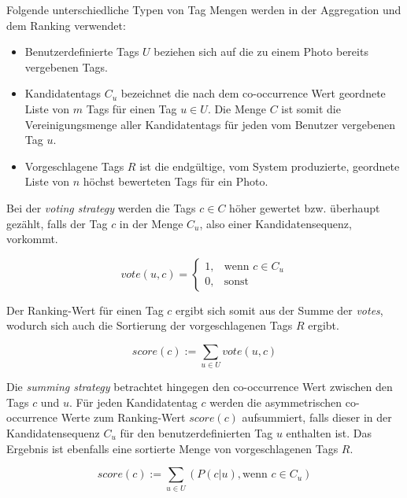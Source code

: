 Folgende unterschiedliche Typen von Tag Mengen werden in der Aggregation und dem Ranking verwendet:
\begin{itemize}
  \item Benutzerdefinierte Tags $U$ beziehen sich auf die zu einem Photo bereits vergebenen Tags.
  \item Kandidatentags $C_u$ bezeichnet die nach dem co-occurrence Wert geordnete Liste von $m$ Tags für einen Tag $u \in U$. Die Menge $C$ ist somit die Vereinigungsmenge aller Kandidatentags für jeden vom Benutzer vergebenen Tag $u$.
  \item Vorgeschlagene Tags $R$ ist die endgültige, vom System produzierte, geordnete Liste von $n$ höchst bewerteten Tags für ein Photo.
\end{itemize}

Bei der \emph{voting strategy} werden die Tags $c \in C$ höher gewertet bzw. überhaupt gezählt, falls der Tag $c$ in der Menge $C_u$, also einer Kandidatensequenz, vorkommt. 
\begin{figure}[hptb]
 \begin{equation}
 \label{voteAggregation}
  vote(u, c)=\begin{cases}
    1, & \text{wenn } c \in C_u\\
    0, & \text{sonst }
  \end{cases}
 \end{equation}
\end{figure}

Der Ranking-Wert für einen Tag $c$ ergibt sich somit aus der Summe der \emph{votes}, wodurch sich auch die Sortierung der vorgeschlagenen Tags $R$ ergibt.

\begin{figure}[hptb]
 \begin{equation}
 \label{voteScoreAggregation}
    score(c) := \sum_{u \in U} vote(u, c)
 \end{equation}
\end{figure}


Die \emph{summing strategy} betrachtet hingegen den co-occurrence Wert zwischen den Tags $c$ und $u$. Für jeden Kandidatentag $c$ werden die asymmetrischen co-occurrence Werte zum Ranking-Wert $score(c)$ aufsummiert, falls dieser in der Kandidatensequenz $C_u$ für den benutzerdefinierten Tag $u$ enthalten ist. Das Ergebnis ist ebenfalls eine sortierte Menge von vorgeschlagenen Tags $R$.
\begin{figure}[hptb]
 \begin{equation}
 \label{sumScoreAggregation}
    score(c) := \sum_{u \in U} (P(c \vert u), \text{wenn } c \in C_u)
 \end{equation}
\end{figure}

